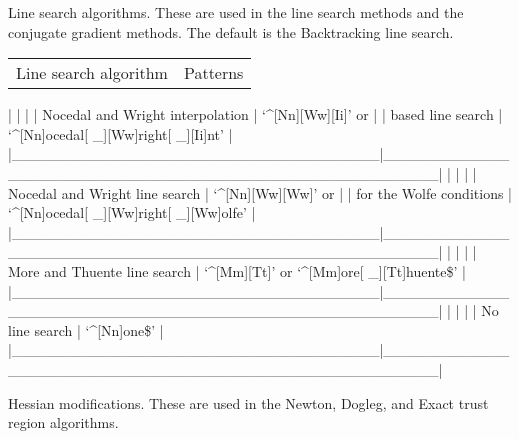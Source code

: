 Line search algorithms.  These are used in the line search methods and the conjugate gradient
methods.  The default is the Backtracking line search.


\begin{tabular}{cc}
Line search algorithm & Patterns \\
\end{tabular}
|                                   |                                                     |
| Nocedal and Wright interpolation  | `\^{}[Nn][Ww][Ii]' or                                  |
| based line search                 | `\^{}[Nn]ocedal[ \_][Ww]right[ \_][Ii]nt'                |
|\_\_\_\_\_\_\_\_\_\_\_\_\_\_\_\_\_\_\_\_\_\_\_\_\_\_\_\_\_\_\_\_\_\_\_|\_\_\_\_\_\_\_\_\_\_\_\_\_\_\_\_\_\_\_\_\_\_\_\_\_\_\_\_\_\_\_\_\_\_\_\_\_\_\_\_\_\_\_\_\_\_\_\_\_\_\_\_\_|
|                                   |                                                     |
| Nocedal and Wright line search    | `\^{}[Nn][Ww][Ww]' or                                  |
| for the Wolfe conditions          | `\^{}[Nn]ocedal[ \_][Ww]right[ \_][Ww]olfe'              |
|\_\_\_\_\_\_\_\_\_\_\_\_\_\_\_\_\_\_\_\_\_\_\_\_\_\_\_\_\_\_\_\_\_\_\_|\_\_\_\_\_\_\_\_\_\_\_\_\_\_\_\_\_\_\_\_\_\_\_\_\_\_\_\_\_\_\_\_\_\_\_\_\_\_\_\_\_\_\_\_\_\_\_\_\_\_\_\_\_|
|                                   |                                                     |
| More and Thuente line search      | `\^{}[Mm][Tt]' or `\^{}[Mm]ore[ \_][Tt]huente\$'            |
|\_\_\_\_\_\_\_\_\_\_\_\_\_\_\_\_\_\_\_\_\_\_\_\_\_\_\_\_\_\_\_\_\_\_\_|\_\_\_\_\_\_\_\_\_\_\_\_\_\_\_\_\_\_\_\_\_\_\_\_\_\_\_\_\_\_\_\_\_\_\_\_\_\_\_\_\_\_\_\_\_\_\_\_\_\_\_\_\_|
|                                   |                                                     |
| No line search                    | `\^{}[Nn]one\$'                                         |
|\_\_\_\_\_\_\_\_\_\_\_\_\_\_\_\_\_\_\_\_\_\_\_\_\_\_\_\_\_\_\_\_\_\_\_|\_\_\_\_\_\_\_\_\_\_\_\_\_\_\_\_\_\_\_\_\_\_\_\_\_\_\_\_\_\_\_\_\_\_\_\_\_\_\_\_\_\_\_\_\_\_\_\_\_\_\_\_\_|



Hessian modifications.  These are used in the Newton, Dogleg, and Exact trust region algorithms.


